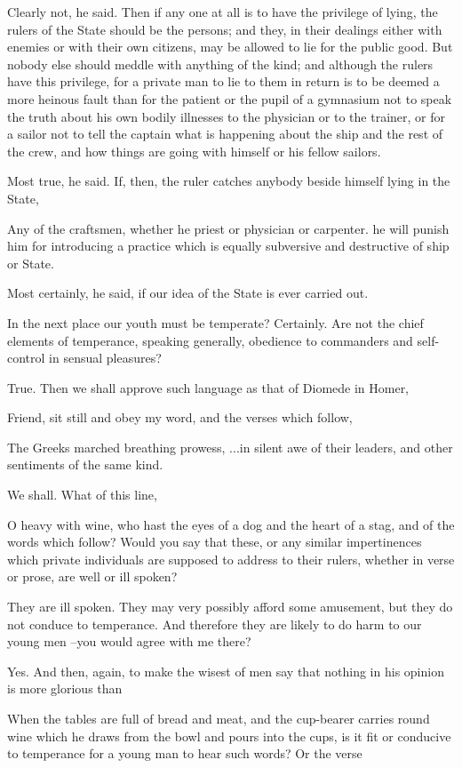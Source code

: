 Clearly not, he said.
Then if any one at all is to have the privilege of lying, the rulers of the State should be the persons; and they, in their dealings either with enemies or with their own citizens, may be allowed to lie for the public good. But nobody else should meddle with anything of the kind; and although the rulers have this privilege, for a private man to lie to them in return is to be deemed a more heinous fault than for the patient or the pupil of a gymnasium not to speak the truth about his own bodily illnesses to the physician or to the trainer, or for a sailor not to tell the captain what is happening about the ship and the rest of the crew, and how things are going with himself or his fellow sailors.

Most true, he said.
If, then, the ruler catches anybody beside himself lying in the State,

Any of the craftsmen, whether he priest or physician or carpenter. he will punish him for introducing a practice which is equally subversive and destructive of ship or State.

Most certainly, he said, if our idea of the State is ever carried out.

In the next place our youth must be temperate?
Certainly.
Are not the chief elements of temperance, speaking generally, obedience to commanders and self-control in sensual pleasures?

True.
Then we shall approve such language as that of Diomede in Homer,

Friend, sit still and obey my word, and the verses which follow,

The Greeks marched breathing prowess,
...in silent awe of their leaders, and other sentiments of the same kind.

We shall.
What of this line,

O heavy with wine, who hast the eyes of a dog and the heart of a stag, and of the words which follow? Would you say that these, or any similar impertinences which private individuals are supposed to address to their rulers, whether in verse or prose, are well or ill spoken?

They are ill spoken.
They may very possibly afford some amusement, but they do not conduce to temperance. And therefore they are likely to do harm to our young men --you would agree with me there?

Yes.
And then, again, to make the wisest of men say that nothing in his opinion is more glorious than

When the tables are full of bread and meat, and the cup-bearer carries round wine which he draws from the bowl and pours into the cups, is it fit or conducive to temperance for a young man to hear such words? Or the verse

